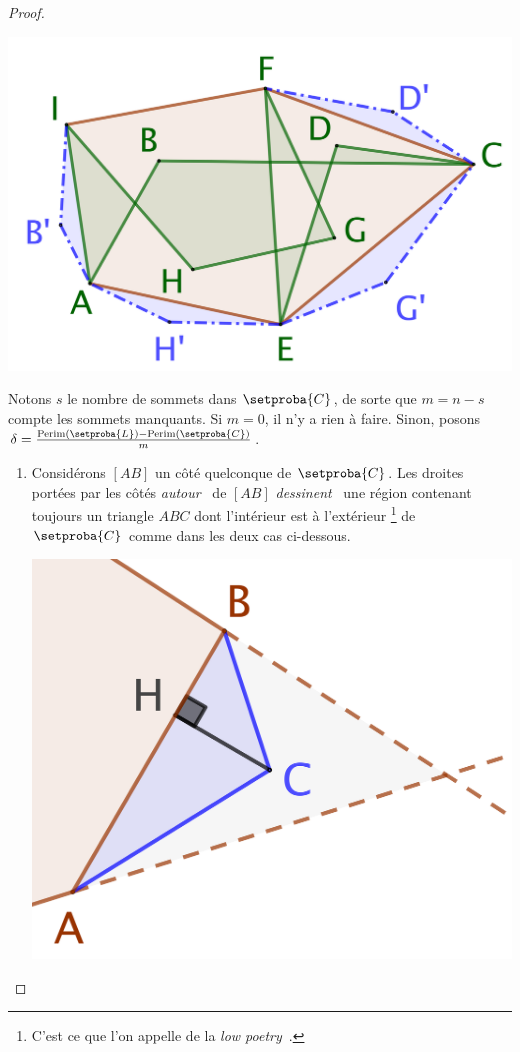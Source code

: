 \begin{proof}
	\begin{center}
		\includegraphics[scale=.4]{content/polygon/at-least-one/convex-hull-distortion.png}
	\end{center}


	Notons $s$ le nombre de sommets dans $\setproba{C}$, de sorte que $m = n - s$ compte les sommets manquants.
	Si $m = 0$, il n'y a rien à faire.
	Sinon, posons $\delta = \frac{\perim{\setproba{L}} - \perim{\setproba{C}}}{m}$.
	\begin{enumerate}
		\item \label{add-vertex-start}
		Considérons $[AB]$ un côté quelconque de $\setproba{C}$.
		Les droites portées par les côtés \og \emph{autour} \fg\ de $[AB]$ \og \emph{dessinent} \fg\ une région contenant toujours un triangle $ABC$ dont l'intérieur est à l'extérieur
		\footnote{
			C'est ce que l'on appelle de la \og \emph{low poetry} \fg\,.
		}
		de $\setproba{C}$ comme dans les deux cas ci-dessous.
		\begin{multicols}{2}
			\centering

			\includegraphics[scale=.4]{content/polygon/at-least-one/add-vertex-1.png}


\end{multicols}
\end{enumerate}
\end{proof}
